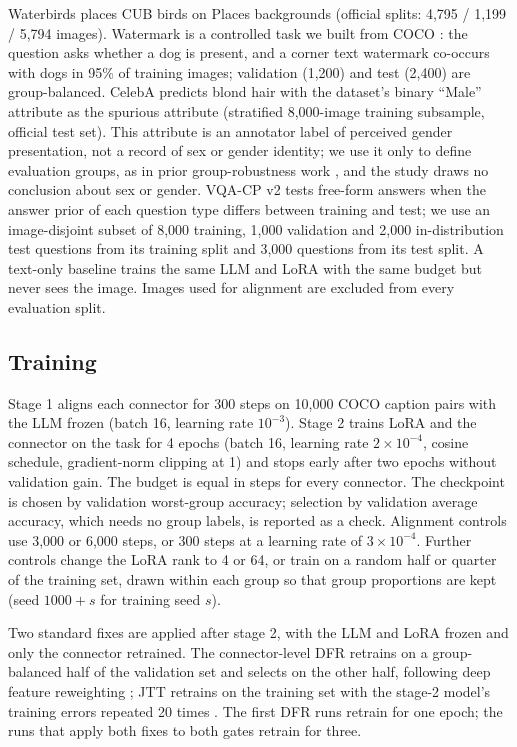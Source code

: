 Waterbirds \citep{sagawa2020groupdro} places CUB birds \citep{wah2011cub} on Places backgrounds \citep{zhou2018places} (official
splits: 4,795 / 1,199 / 5,794 images). Watermark is a controlled task we built from COCO \citep{lin2014coco}: the question
asks whether a dog is present, and a corner text watermark co-occurs with dogs in 95\% of training images; validation
(1,200) and test (2,400) are group-balanced. CelebA \citep{liu2015celeba} predicts blond hair with the dataset's binary ``Male'' attribute as the spurious attribute
(stratified 8,000-image training subsample, official test set). This attribute is an annotator label of perceived
gender presentation, not a record of sex or gender identity; we use it only to define evaluation groups, as in prior
group-robustness work \citep{sagawa2020groupdro}, and the study draws no conclusion about sex or gender. VQA-CP v2 \citep{agrawal2018vqacp} tests
free-form answers when the answer prior of each question type differs between training and test; we use an
image-disjoint subset of 8,000 training, 1,000 validation and 2,000 in-distribution test questions from its training
split and 3,000 questions from its test split. A text-only baseline trains the same LLM and LoRA with the same
budget but never sees the image. Images used for alignment are excluded from every evaluation split.

\subsection{Training}

Stage 1 aligns each connector for 300 steps on 10,000 COCO caption pairs with the LLM frozen (batch 16, learning
rate \(10^{-3}\)). Stage 2 trains LoRA and the connector on the task for 4 epochs (batch 16, learning rate
\(2 \times 10^{-4}\), cosine schedule, gradient-norm clipping at 1) and stops early after two epochs without
validation gain. The budget is equal in steps for every connector. The checkpoint is chosen by validation
worst-group accuracy; selection by validation average accuracy, which needs no group labels, is reported as a check.
Alignment controls use 3,000 or 6,000 steps, or 300 steps at a learning rate of \(3 \times 10^{-4}\). Further
controls change the LoRA rank to 4 or 64, or train on a random half or quarter of the training set, drawn within
each group so that group proportions are kept (seed \(1000 + s\) for training seed \(s\)).

Two standard fixes are applied after stage 2, with the LLM and LoRA frozen and only the connector retrained. The
connector-level DFR retrains on a group-balanced half of the validation set and selects on the other half, following
deep feature reweighting \citep{kirichenko2023dfr}; JTT retrains on the training set with the stage-2 model's training
errors repeated 20 times \citep{liu2021jtt}. The first DFR runs retrain for one epoch; the runs that apply both fixes to
both gates retrain for three.

